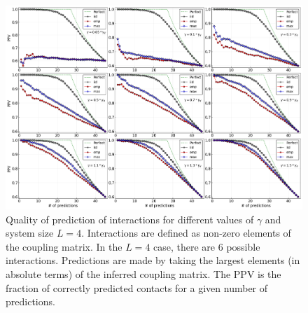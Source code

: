 \documentclass[preprint,amsmath,amssymb,superscriptaddress,showpacs,pre]{revtex4-1}
\begin{document}
  
\begin{figure}[!htb]
	\centering
	\includegraphics[keepaspectratio=true,width=1.0\textwidth]{Figures/PPVs_L10.png}
	\caption{Quality of prediction of interactions for  different values of $\gamma$ and system size $L=4$. Interactions are defined as non-zero elements of the coupling matrix. In the $L=4$ case, there are $6$ possible interactions. Predictions are made by taking the largest elements (in absolute terms) of the inferred coupling matrix. The PPV is the fraction of correctly predicted contacts for a given number of predictions.}
	\label{fig:PPV_L10}
\end{figure}
\end{document}
